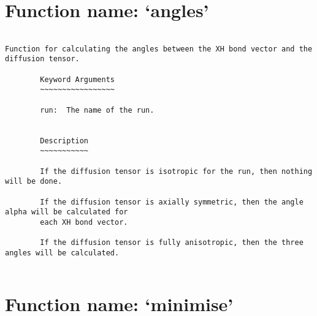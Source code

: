 \normalsize
\section{Function name: `angles'}

\scriptsize
\begin{verbatim}

Function for calculating the angles between the XH bond vector and the diffusion tensor.

        Keyword Arguments
        ~~~~~~~~~~~~~~~~~

        run:  The name of the run.


        Description
        ~~~~~~~~~~~

        If the diffusion tensor is isotropic for the run, then nothing will be done.

        If the diffusion tensor is axially symmetric, then the angle alpha will be calculated for
        each XH bond vector.

        If the diffusion tensor is fully anisotropic, then the three angles will be calculated.
        
\end{verbatim}

\normalsize
\section{Function name: `minimise'}


